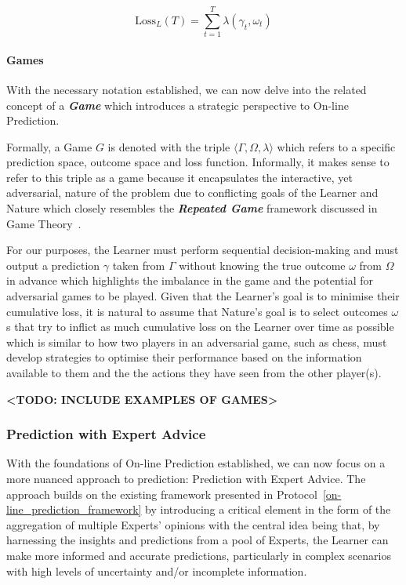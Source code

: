 \begin{equation}
    \text{Loss}_L(T) = \underset{t=1}{\overset{T}{\sum}} \lambda(\gamma_t, \omega_t)
\end{equation}

\paragraph{Games}\label{paragraph:games}
With the necessary notation established, we can now delve into the related concept of a \textbf{\textit{Game}} which introduces a strategic perspective to On-line Prediction.

Formally, a Game $G$ is denoted with the triple $\langle \Gamma, \Omega, \lambda \rangle$ which refers to a specific prediction space, outcome space and loss function. Informally, it makes sense to refer to this triple as a game because it encapsulates the interactive, yet adversarial, nature of the problem due to conflicting goals of the Learner and Nature which closely resembles the \textbf{\textit{Repeated Game}} framework discussed in Game Theory~\cite{mertens:1990}.

For our purposes, the Learner must perform sequential decision-making and must output a prediction $\gamma$ taken from $\Gamma$ without knowing the true outcome $\omega$ from $\Omega$ in advance which highlights the imbalance in the game and the potential for adversarial games to be played. Given that the Learner's goal is to minimise their cumulative loss, it is natural to assume that Nature's goal is to select outcomes $\omega$s that try to inflict as much cumulative loss on the Learner over time as possible which is similar to how two players in an adversarial game, such as chess, must develop strategies to optimise their performance based on the information available to them and the the actions they have seen from the other player(s).

\textbf{<TODO: INCLUDE EXAMPLES OF GAMES>}

\subsubsection{Prediction with Expert Advice}\label{subsubsection:prediction_with_expert_advice}
With the foundations of On-line Prediction established, we can now focus on a more nuanced approach to prediction: Prediction with Expert Advice. The approach builds on the existing framework presented in Protocol~\ref{on-line_prediction_framework} by introducing a critical element in the form of the aggregation of multiple Experts' opinions with the central idea being that, by harnessing the insights and predictions from a pool of Experts, the Learner can make more informed and accurate predictions, particularly in complex scenarios with high levels of uncertainty and/or incomplete information.

